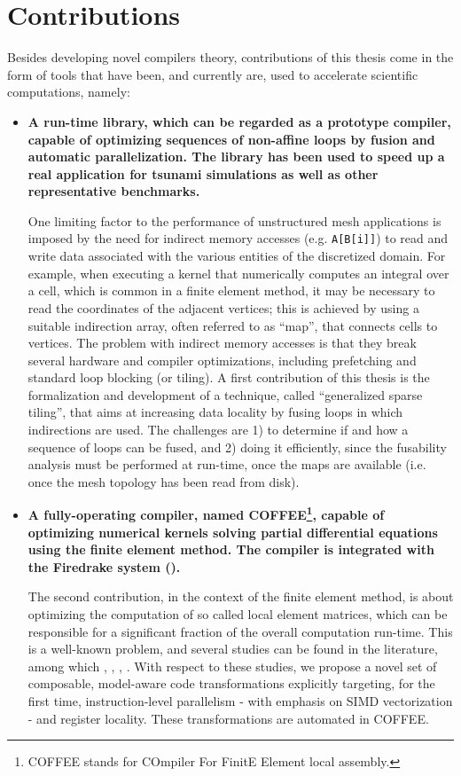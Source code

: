 \section{Contributions}
Besides developing novel compilers theory, contributions of this thesis come in the form of tools that have been, and currently are, used to accelerate scientific computations, namely:
\begin{itemize}
\item \textbf{A run-time library, which can be regarded as a prototype compiler, capable of optimizing sequences of non-affine loops by fusion and automatic parallelization. The library has been used to speed up a real application for tsunami simulations as well as other representative benchmarks.}

One limiting factor to the performance of unstructured mesh applications is imposed by
the need for indirect memory accesses (e.g. \texttt{A[B[i]]}) to read and
write data associated with the various entities of the discretized domain.
For example, when executing a kernel that numerically computes an integral over a cell, 
which is common in a finite element method, it may be necessary
to read the coordinates of the adjacent vertices; this is achieved by
using a suitable indirection array, often referred to as ``map'', that
connects cells to vertices. The problem with indirect 
memory accesses is that they break several hardware and compiler optimizations,
including prefetching and standard loop blocking (or tiling). A first contribution of this thesis
is the formalization and development of a technique, called ``generalized sparse tiling'',
that aims at increasing data locality by fusing loops in which indirections
are used. The challenges are 1) to determine if and how a sequence of loops can be fused,
and 2) doing it efficiently, since the fusability analysis must be performed at
run-time, once the maps are available (i.e. once the mesh topology has been read 
from disk).

\item \textbf{A fully-operating compiler, named COFFEE\footnote{COFFEE stands for COmpiler For FinitE Element local assembly.}, capable of optimizing numerical kernels solving partial differential equations using the finite element method. The compiler is integrated with the Firedrake system (\cite{firedrake-code}).}

The second contribution, in the context of the finite element method, is about 
optimizing the computation of so called local element matrices, which can 
be responsible for a significant fraction of the overall computation run-time.
This is a well-known problem, and several studies can be found in the literature,
among which \cite{francis}, \cite{quadrature-olegaard}, \cite{petsc-integration-gpu}, 
\cite{tensor-kirby}. With respect to these studies, we propose a novel 
set of composable, model-aware code transformations explicitly targeting, for the first time,
instruction-level parallelism - with emphasis on SIMD vectorization - and register locality. 
These transformations are automated in COFFEE.
\end{itemize}

